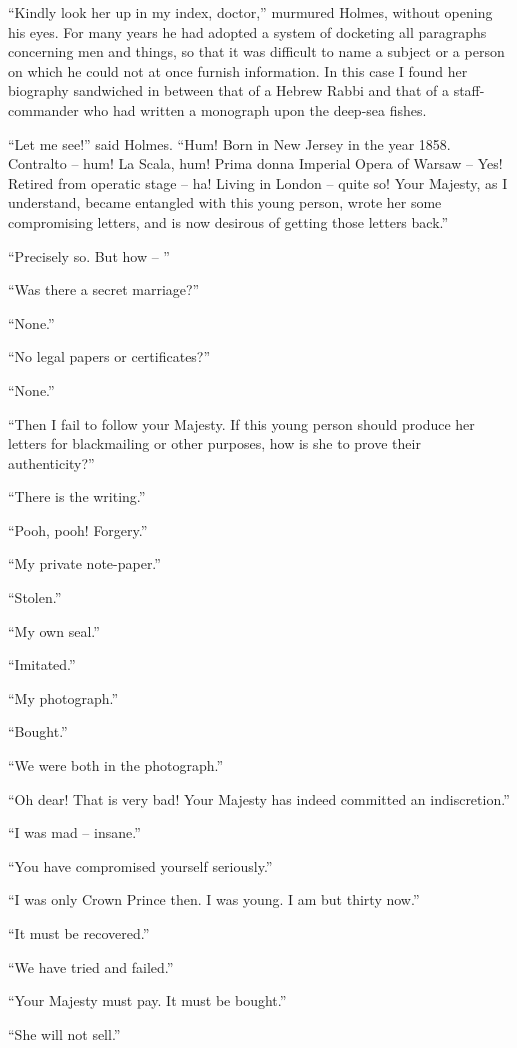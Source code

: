 “Kindly look her up in my index, doctor,” murmured
Holmes, without opening his eyes. For many years he had
adopted a system of docketing all paragraphs concerning men
and things, so that it was difficult to name a subject or a person
on which he could not at once furnish information. In
this case I found her biography sandwiched in between that
of a Hebrew Rabbi and that of a staff-commander who had
written a monograph upon the deep-sea fishes.

“Let me see!” said Holmes. “Hum! Born in New
Jersey in the year 1858. Contralto -- hum! La Scala, hum!
Prima donna Imperial Opera of Warsaw -- Yes! Retired from
operatic stage -- ha! Living in London -- quite so! Your
Majesty, as I understand, became entangled with this young
person, wrote her some compromising letters, and is now desirous
of getting those letters back.”

“Precisely so. But how -- ”

“Was there a secret marriage?”

“None.”

“No legal papers or certificates?”

“None.”

“Then I fail to follow your Majesty. If this young person
should produce her letters for blackmailing or other purposes,
how is she to prove their authenticity?”

“There is the writing.”

“Pooh, pooh! Forgery.”

“My private note-paper.”

“Stolen.”

“My own seal.”

“Imitated.”

“My photograph.”

“Bought.”

“We were both in the photograph.”

“Oh dear! That is very bad! Your Majesty has indeed
committed an indiscretion.”

“I was mad -- insane.”

“You have compromised yourself seriously.”

“I was only Crown Prince then. I was young. I am but
thirty now.”

“It must be recovered.”

“We have tried and failed.”

“Your Majesty must pay. It must be bought.”

“She will not sell.”

